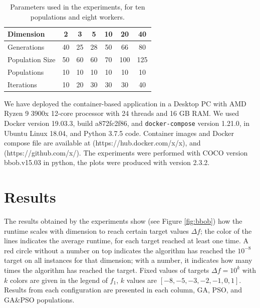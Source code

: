 \documentclass[runningheads]{llncs}
\begin{document}
\begin{table}[h!tb]
  \small
  \caption{Parameters used in the experiments, for ten populations and eight workers.
  }
  \label{tab:params:10}
  \vspace{0.25cm}
  \centering
  \small
  \begin{tabular}{|l|c|c|c|c|c|c|}
    \hline
    Dimension        & 2  & 3  & 5  & 10 & 20  & 40  \\ \hline
    Generations      & 40 & 25 & 28 & 50 & 66  & 80  \\ \hline
    Population Size  & 50 & 60 & 60 & 70 & 100 & 125 \\ \hline
    Populations      & 10 & 10 & 10 & 10 & 10  & 10  \\ \hline
    Iterations       & 10 & 20 & 30 & 30 & 30  & 40  \\ \hline  
  \end{tabular}
\end{table}

We have deployed the container-based application in a
Desktop PC with AMD Ryzen 9 3900x 12-core processor with 24 threads 
and 16 GB RAM. We used Docker version 19.03.3, build a872fc2f86, and {\tt docker-compose} version 1.21.0, 
in Ubuntu Linux 18.04, and Python 3.7.5 code. Container images and Docker compose file are available at
(https://hub.docker.com/x/x), and (https://github.com/x/).
The experiments were performed with COCO \cite{hansen2016coco} version bbob.v15.03 in python, 
the plots were produced with version 2.3.2.


\section{Results}
\label{results}

The results obtained by the experiments show (see Figure \ref{fig:bbob}) how
the runtime scales with dimension to reach certain target values $\Delta f$;
the color of the lines indicates the average runtime, for each target reached
at least one time. A red circle without a number on top indicates the algorithm
has reached the $10^{-8}$ target on all instances for that dimension;
with a number, it indicates how many times the algorithm has reached
the target. Fixed values of targets $\Delta f = 10^{k}$ with $k$ colors are
given in the legend of $f_1$, $k$ values are $[-8,-5,-3,-2,-1,0,1]$. Results
from each configuration are presented in each column, GA, PSO, and GA\&PSO
populations.
\end{document}
